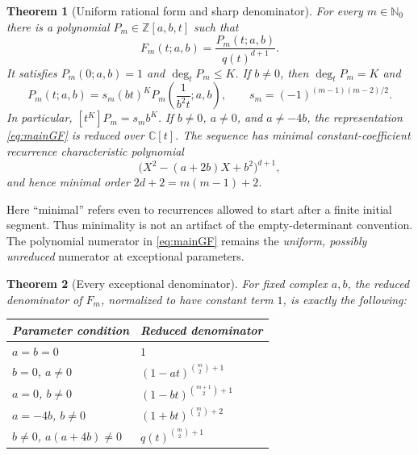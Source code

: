 \documentclass[11pt,a4paper]{article}
\numberwithin{equation}{section}
\newtheorem{theorem}{Theorem}[section]
\theoremstyle{definition}
\theoremstyle{remark}
\newcommand{\NN}{\mathbb N_0}
\newcommand{\CC}{\mathbb C}
\newcommand{\ZZ}{\mathbb Z}
\begin{document}
\begin{theorem}[Uniform rational form and sharp denominator]\label{thm:main}
For every $m\in\NN$ there is a polynomial $P_m\in\ZZ[a,b,t]$ such that
\begin{equation}\label{eq:mainGF}
 F_m(t;a,b)=\frac{P_m(t;a,b)}{q(t)^{d+1}}.
\end{equation}
It satisfies $P_m(0;a,b)=1$ and $\deg_t P_m\leq K$.
If $b\ne0$, then $\deg_t P_m=K$ and
\begin{equation}\label{eq:reciprocity}
 P_m(t;a,b)=s_m(bt)^K P_m\!\left(\frac{1}{b^2t};a,b\right),
 \qquad s_m=(-1)^{(m-1)(m-2)/2}.
\end{equation}
In particular, $[t^K]P_m=s_m b^K$.
If $b\ne0$, $a\ne0$, and $a\ne-4b$, the representation
\eqref{eq:mainGF} is reduced over $\CC[t]$.  The sequence has minimal
constant-coefficient recurrence characteristic polynomial
\begin{equation}\label{eq:charpoly}
 \bigl(X^2-(a+2b)X+b^2\bigr)^{d+1},
\end{equation}
and hence minimal order $2d+2=m(m-1)+2$.
\end{theorem}

Here ``minimal'' refers even to recurrences allowed to start after a
finite initial segment.  Thus minimality is not an artifact of the
empty-determinant convention.  The polynomial numerator in
\eqref{eq:mainGF} remains the \emph{uniform, possibly unreduced} numerator
at exceptional parameters.

\begin{theorem}[Every exceptional denominator]\label{thm:exceptional}
For fixed complex $a,b$, the reduced denominator of $F_m$, normalized to
have constant term $1$, is exactly the following:
\begin{center}
\renewcommand{\arraystretch}{1.35}
\begin{tabular}{@{}ll@{}}
\toprule
Parameter condition & Reduced denominator\\
\midrule
$a=b=0$ & $1$\\
$b=0$, $a\ne0$ & $(1-at)^{\binom m2+1}$\\
$a=0$, $b\ne0$ & $(1-bt)^{\binom{m+1}{2}+1}$\\
$a=-4b$, $b\ne0$ & $(1+bt)^{\binom m2+2}$\\
$b\ne0$, $a(a+4b)\ne0$ & $q(t)^{\binom m2+1}$\\
\bottomrule
\end{tabular}
\end{center}
\end{theorem}
\end{document}
